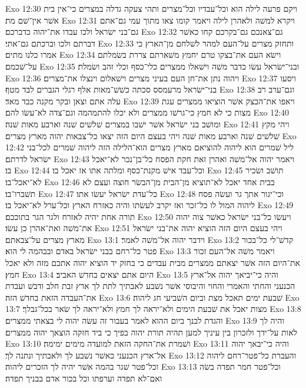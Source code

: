 Exo 12:30  ויקם פרעה לילה הוא וכל־עבדיו וכל־מצרים ותהי צעקה גדלה במצרים כי־אין בית אשׁר אין־שׁם מת׃
Exo 12:31  ויקרא למשׁה ולאהרן לילה ויאמר קומו צאו מתוך עמי גם־אתם גם־בני ישׂראל ולכו עבדו את־יהוה כדברכם׃
Exo 12:32  גם־צאנכם גם־בקרכם קחו כאשׁר דברתם ולכו וברכתם גם־אתי׃
Exo 12:33  ותחזק מצרים על־העם למהר לשׁלחם מן־הארץ כי אמרו כלנו מתים׃
Exo 12:34  וישׂא העם את־בצקו טרם יחמץ משׁארתם צררת בשׂמלתם על־שׁכמם׃
Exo 12:35  ובני־ישׂראל עשׂו כדבר משׁה וישׁאלו ממצרים כלי־כסף וכלי זהב ושׂמלת׃
Exo 12:36  ויהוה נתן את־חן העם בעיני מצרים וישׁאלום וינצלו את־מצרים׃
Exo 12:37  ויסעו בני־ישׂראל מרעמסס סכתה כשׁשׁ־מאות אלף רגלי הגברים לבד מטף׃
Exo 12:38  וגם־ערב רב עלה אתם וצאן ובקר מקנה כבד מאד׃
Exo 12:39  ויאפו את־הבצק אשׁר הוציאו ממצרים עגת מצות כי לא חמץ כי־גרשׁו ממצרים ולא יכלו להתמהמה וגם־צדה לא־עשׂו להם׃
Exo 12:40  ומושׁב בני ישׂראל אשׁר ישׁבו במצרים שׁלשׁים שׁנה וארבע מאות שׁנה׃
Exo 12:41  ויהי מקץ שׁלשׁים שׁנה וארבע מאות שׁנה ויהי בעצם היום הזה יצאו כל־צבאות יהוה מארץ מצרים׃
Exo 12:42  ליל שׁמרים הוא ליהוה להוציאם מארץ מצרים הוא־הלילה הזה ליהוה שׁמרים לכל־בני ישׂראל לדרתם׃
Exo 12:43  ויאמר יהוה אל־משׁה ואהרן זאת חקת הפסח כל־בן־נכר לא־יאכל בו׃
Exo 12:44  וכל־עבד אישׁ מקנת־כסף ומלתה אתו אז יאכל בו׃
Exo 12:45  תושׁב ושׂכיר לא־יאכל־בו׃
Exo 12:46  בבית אחד יאכל לא־תוציא מן־הבית מן־הבשׂר חוצה ועצם לא תשׁברו־בו׃
Exo 12:47  כל־עדת ישׂראל יעשׂו אתו׃
Exo 12:48  וכי־יגור אתך גר ועשׂה פסח ליהוה המול לו כל־זכר ואז יקרב לעשׂתו והיה כאזרח הארץ וכל־ערל לא־יאכל בו׃
Exo 12:49  תורה אחת יהיה לאזרח ולגר הגר בתוככם׃
Exo 12:50  ויעשׂו כל־בני ישׂראל כאשׁר צוה יהוה את־משׁה ואת־אהרן כן עשׂו׃
Exo 12:51  ויהי בעצם היום הזה הוציא יהוה את־בני ישׂראל מארץ מצרים על־צבאתם׃
Exo 13:1  וידבר יהוה אל־משׁה לאמר׃
Exo 13:2  קדשׁ־לי כל־בכור פטר כל־רחם בבני ישׂראל באדם ובבהמה לי הוא׃
Exo 13:3  ויאמר משׁה אל־העם זכור את־היום הזה אשׁר יצאתם ממצרים מבית עבדים כי בחזק יד הוציא יהוה אתכם מזה ולא יאכל חמץ׃
Exo 13:4  היום אתם יצאים בחדשׁ האביב׃
Exo 13:5  והיה כי־יביאך יהוה אל־ארץ הכנעני והחתי והאמרי והחוי והיבוסי אשׁר נשׁבע לאבתיך לתת לך ארץ זבת חלב ודבשׁ ועבדת את־העבדה הזאת בחדשׁ הזה׃
Exo 13:6  שׁבעת ימים תאכל מצת וביום השׁביעי חג ליהוה׃
Exo 13:7  מצות יאכל את שׁבעת הימים ולא־יראה לך חמץ ולא־יראה לך שׂאר בכל־גבלך׃
Exo 13:8  והגדת לבנך ביום ההוא לאמר בעבור זה עשׂה יהוה לי בצאתי ממצרים׃
Exo 13:9  והיה לך לאות על־ידך ולזכרון בין עיניך למען תהיה תורת יהוה בפיך כי ביד חזקה הוצאך יהוה ממצרים׃
Exo 13:10  ושׁמרת את־החקה הזאת למועדה מימים ימימה׃
Exo 13:11  והיה כי־יבאך יהוה אל־ארץ הכנעני כאשׁר נשׁבע לך ולאבתיך ונתנה לך׃
Exo 13:12  והעברת כל־פטר־רחם ליהוה וכל־פטר שׁגר בהמה אשׁר יהיה לך הזכרים ליהוה׃
Exo 13:13  וכל־פטר חמר תפדה בשׂה ואם־לא תפדה וערפתו וכל בכור אדם בבניך תפדה׃

